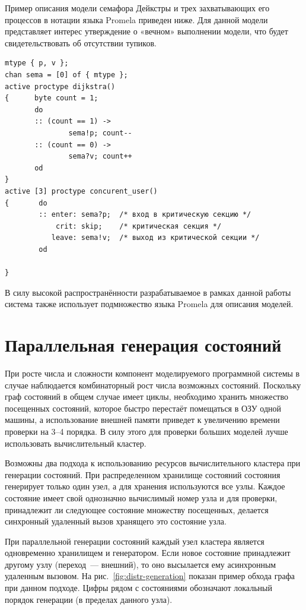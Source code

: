 \documentclass[12pt,a4paper,fleqn]{article}
\begin{document}
Пример описания модели семафора Дейкстры и трех захватывающих его процессов в нотации языка Promela приведен ниже.
Для данной модели представляет интерес утверждение о «вечном» выполнении модели, что будет свидетельствовать об отсутствии тупиков.

\begin{verbatim}
mtype { p, v };
chan sema = [0] of { mtype };
active proctype dijkstra()
{      byte count = 1;
       do
       :: (count == 1) ->
               sema!p; count--
       :: (count == 0) ->
               sema?v; count++
       od
}
active [3] proctype concurent_user()
{       do
        :: enter: sema?p;  /* вход в критическую секцию */
            crit: skip;    /* критическая секция */
           leave: sema!v;  /* выход из критической секции */
        od

}
\end{verbatim}

В силу высокой распространённости разрабатываемое в рамках данной работы система также использует подмножество языка Promela для описания моделей.

\section{Параллельная генерация состояний}
\label{sec:pargen}

При росте числа и сложности компонент моделируемого программной системы в случае наблюдается комбинаторный рост числа
возможных состояний.
Поскольку граф состояний в общем случае имеет циклы, необходимо хранить множество посещенных состояний, которое быстро перестаёт помещаться в ОЗУ одной машины, а использование внешней памяти приведет к увеличению времени проверки на 3--4 порядка. В силу этого для проверки больших моделей лучше использовать вычислительный кластер.

Возможны два подхода к использованию ресурсов вычислительного кластера при генерации состояний.
При распределенном хранилище состояний состояния генерирует только один узел, а для хранения используются все узлы.
Каждое состояние имеет свой однозначно вычислимый номер узла и для проверки, принадлежит ли следующее состояние множеству посещенных, делается синхронный удаленный вызов хранящего это состояние узла.

При параллельной генерации состояний каждый узел кластера является одновременно хранилищем и генератором.
Если новое состояние принадлежит другому узлу (переход~--- внешний), то оно высылается ему асинхронным удаленным вызовом. На рис.~\ref{fig:distr-generation} показан пример обхода графа при данном подходе.
Цифры рядом с состояниями обозначают локальный порядок генерации (в пределах данного узла).
\end{document}
